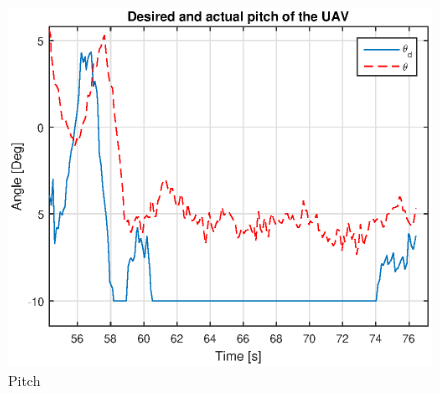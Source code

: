 \begin{figure}[H]
\centering
\includegraphics[scale=0.7]{figs/Experiment/Pitch1juni081328.eps}
\caption{Pitch}
\label{Fig:Pitch1juni081328}
\end{figure}
